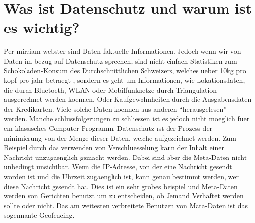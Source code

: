 \documentclass{report}
\begin{document}
\section{Was ist Datenschutz und warum ist es wichtig?}
Per mirriam-webster \citep{data-def} sind Daten faktuelle Informationen.
Jedoch wenn wir von Daten im bezug auf Datenschutz sprechen, sind nicht einfach Statistiken zum Schokoladen-Konsum des Durchschnittlichen Schweizers, welches ueber 10kg pro kopf pro jahr betraegt \citep{schokoladenkonsum-pro-kops-schweiz},
sondern es geht um Informationen, wie Lokationsdaten, die durch Bluetooth, WLAN oder Mobilfunknetze durch Triangulation \citep{triangulation} ausgerechnet werden koennen. Oder Kaufgewohnheiten durch die Ausgabensdaten der Kredikarten.
Viele solche Daten koennen aus anderen \enquote{herausgelesen} werden. Manche schlussfolgerungen zu schliessen ist es jedoch nicht moeglich fuer ein klassisches Computer-Programm.
\newline
\newline
Datenschutz ist der Prozess der minimierung von der Menge dieser Daten, welche aufgezeichnet werden. Zum Beispiel durch das verwenden von Verschluesselung kann der Inhalt einer Nachricht unzugaenglich gemacht werden. Dabei sind aber die Meta-Daten \citep{metadata} nicht unbedingt unsichtbar. Wenn die IP-Adresse, von der eine Nachricht gesendt worden ist und die Uhrzeit zugaenglich ist, kann genau bestimmt werden, wer diese Nachricht gesendt hat. Dies ist ein sehr grobes beispiel und Meta-Daten werden von Gerichten benutzt um zu entscheiden, ob Jemand Verhaftet werden sollte oder nicht. 
\newline
\newline
Das am weitesten verbreitete Benutzen von Mata-Daten ist das sogennante Geofencing.\citep{geofencing}
\end{document}

